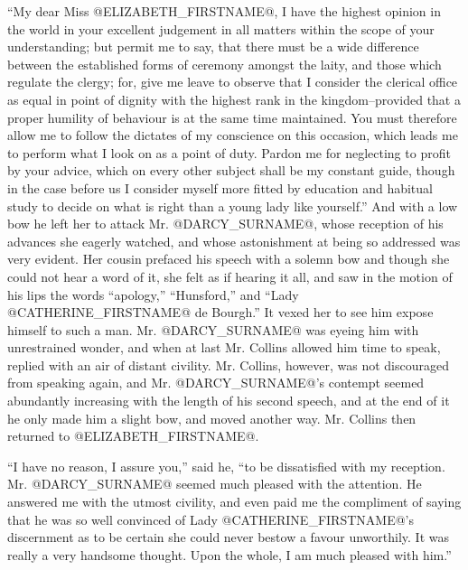 ``My dear Miss @ELIZABETH_FIRSTNAME@, I have the highest opinion in the world in
your excellent judgement in all matters within the scope of your
understanding; but permit me to say, that there must be a wide
difference between the established forms of ceremony amongst the laity,
and those which regulate the clergy; for, give me leave to observe that
I consider the clerical office as equal in point of dignity with
the highest rank in the kingdom--provided that a proper humility of
behaviour is at the same time maintained. You must therefore allow me to
follow the dictates of my conscience on this occasion, which leads me to
perform what I look on as a point of duty. Pardon me for neglecting to
profit by your advice, which on every other subject shall be my constant
guide, though in the case before us I consider myself more fitted by
education and habitual study to decide on what is right than a young
lady like yourself.'' And with a low bow he left her to attack Mr.
@DARCY_SURNAME@, whose reception of his advances she eagerly watched, and whose
astonishment at being so addressed was very evident. Her cousin prefaced
his speech with a solemn bow and though she could not hear a word of
it, she felt as if hearing it all, and saw in the motion of his lips the
words ``apology,'' ``Hunsford,'' and ``Lady @CATHERINE_FIRSTNAME@ de Bourgh.'' It vexed
her to see him expose himself to such a man. Mr. @DARCY_SURNAME@ was eyeing him
with unrestrained wonder, and when at last Mr. Collins allowed him time
to speak, replied with an air of distant civility. Mr. Collins, however,
was not discouraged from speaking again, and Mr. @DARCY_SURNAME@'s contempt seemed
abundantly increasing with the length of his second speech, and at the
end of it he only made him a slight bow, and moved another way. Mr.
Collins then returned to @ELIZABETH_FIRSTNAME@.

``I have no reason, I assure you,'' said he, ``to be dissatisfied with my
reception. Mr. @DARCY_SURNAME@ seemed much pleased with the attention. He answered
me with the utmost civility, and even paid me the compliment of saying
that he was so well convinced of Lady @CATHERINE_FIRSTNAME@'s discernment as to be
certain she could never bestow a favour unworthily. It was really a very
handsome thought. Upon the whole, I am much pleased with him.''

